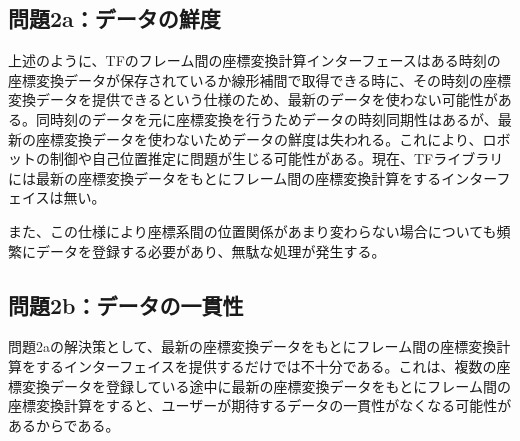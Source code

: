 \documentclass[a4paper]{jreport}	%
\begin{document}
\subsection*{問題2a：データの鮮度}
上述のように、TFのフレーム間の座標変換計算インターフェースはある時刻の座標変換データが保存されているか線形補間で取得できる時に、その時刻の座標変換データを提供できるという仕様のため、最新のデータを使わない可能性がある。同時刻のデータを元に座標変換を行うためデータの時刻同期性はあるが、最新の座標変換データを使わないためデータの鮮度は失われる。これにより、ロボットの制御や自己位置推定に問題が生じる可能性がある。現在、TFライブラリには最新の座標変換データをもとにフレーム間の座標変換計算をするインターフェイスは無い。

また、この仕様により座標系間の位置関係があまり変わらない場合についても頻繁にデータを登録する必要があり、無駄な処理が発生する。

\subsection*{問題2b：データの一貫性}
問題2aの解決策として、最新の座標変換データをもとにフレーム間の座標変換計算をするインターフェイスを提供するだけでは不十分である。これは、複数の座標変換データを登録している途中に最新の座標変換データをもとにフレーム間の座標変換計算をすると、ユーザーが期待するデータの一貫性がなくなる可能性があるからである。


\end{document}
